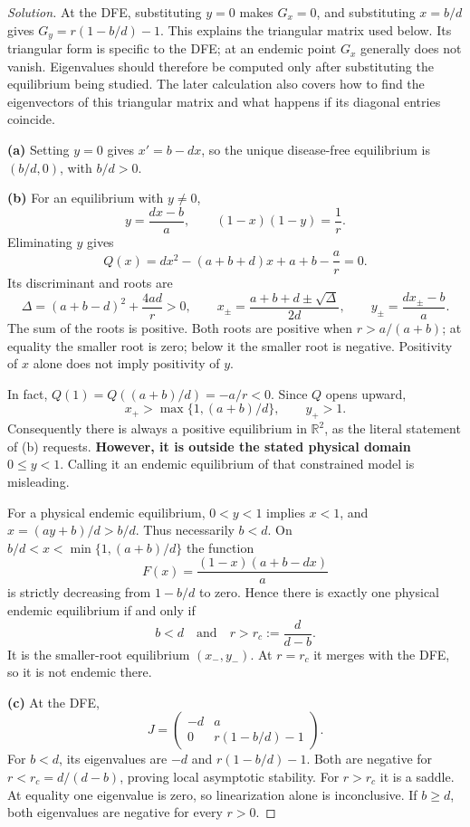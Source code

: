 \documentclass[10pt]{amsart}
\newenvironment{solution}
{\begin{proof}[Solution]}
{\end{proof}}
\begin{document}
\begin{enumerate}[label=\arabic*), leftmargin=*, itemsep=1em]
\begin{solution}
At the DFE, substituting $y=0$ makes $G_x=0$, and substituting $x=b/d$ gives $G_y=r(1-b/d)-1$. This explains the triangular matrix used below. Its triangular form is specific to the DFE; at an endemic point $G_x$ generally does not vanish. Eigenvalues should therefore be computed only after substituting the equilibrium being studied. The later calculation also covers how to find the eigenvectors of this triangular matrix and what happens if its diagonal entries coincide.


\textbf{(a)} Setting $y=0$ gives $x'=b-dx$, so the unique disease-free equilibrium is $(b/d,0)$, with $b/d>0$.

\textbf{(b)} For an equilibrium with $y\ne0$,
\[
y=\frac{dx-b}{a},\qquad (1-x)(1-y)=\frac1r.
\]
Eliminating $y$ gives
\[
Q(x)=dx^2-(a+b+d)x+a+b-\frac ar=0.
\]
Its discriminant and roots are
\[
\Delta=(a+b-d)^2+\frac{4ad}{r}>0,\qquad
x_\pm=\frac{a+b+d\pm\sqrt\Delta}{2d},\qquad
y_\pm=\frac{dx_\pm-b}{a}.
\]
The sum of the roots is positive. Both roots are positive when $r>a/(a+b)$; at equality the smaller root is zero; below it the smaller root is negative. Positivity of $x$ alone does not imply positivity of $y$.

In fact, $Q(1)=Q((a+b)/d)=-a/r<0$. Since $Q$ opens upward,
\[
x_+>\max\{1,(a+b)/d\},\qquad y_+>1.
\]
Consequently there is always a positive equilibrium in $\mathbb R^2$, as the literal statement of (b) requests. \textbf{However, it is outside the stated physical domain $0\le y<1$}. Calling it an endemic equilibrium of that constrained model is misleading.

For a physical endemic equilibrium, $0<y<1$ implies $x<1$, and $x=(ay+b)/d>b/d$. Thus necessarily $b<d$. On $b/d<x<\min\{1,(a+b)/d\}$ the function
\[
F(x)=\frac{(1-x)(a+b-dx)}a
\]
is strictly decreasing from $1-b/d$ to zero. Hence there is exactly one physical endemic equilibrium if and only if
\[
b<d\quad\text{and}\quad r>r_c:=\frac{d}{d-b}.
\]
It is the smaller-root equilibrium $(x_-,y_-)$. At $r=r_c$ it merges with the DFE, so it is not endemic there.

\textbf{(c)} At the DFE,
\[
J=\begin{pmatrix}-d&a\\0&r(1-b/d)-1\end{pmatrix}.
\]
For $b<d$, its eigenvalues are $-d$ and $r(1-b/d)-1$. Both are negative for $r<r_c=d/(d-b)$, proving local asymptotic stability. For $r>r_c$ it is a saddle. At equality one eigenvalue is zero, so linearization alone is inconclusive. If $b\ge d$, both eigenvalues are negative for every $r>0$.


\end{solution}
\end{enumerate}
\end{document}
